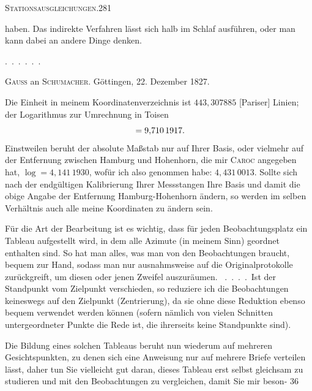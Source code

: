 \clearpage
\noindent\mbox{}\hfill\textsc{Stationsausgleichungen.}\hfill281\par\medskip
\noindent haben. Das indirekte Verfahren lässt sich halb im Schlaf ausführen, oder man kann dabei an andere Dinge denken.

\noindent\hspace*{1.5em}.\ .\ .\ .\ .\ .

\vspace{2cm}
\begin{center}
\textsc{Gauss} an \textsc{Schumacher}. Göttingen, 22. Dezember 1827.
\end{center}
Die Einheit in meinem Koordinatenverzeichnis ist $443{,}307885$ [Pariser] Linien; der Logarithmus zur Umrechnung in Toisen
\[
\llap{\raisebox{1.2ex}{\text{\tiny.}}\hspace{4cm}}=9{,}710\,1917.
\]
Einstweilen beruht der absolute Maßstab nur auf Ihrer Basis, oder vielmehr auf der Entfernung zwischen Hamburg und Hohenhorn, die mir \textsc{Caroc} angegeben hat, $\log=4{,}141\,1930$, wofür ich also genommen habe: $4{,}431\,0013$. Sollte sich nach der endgültigen Kalibrierung Ihrer Messstangen Ihre Basis und damit die obige Angabe der Entfernung Hamburg-Hohenhorn ändern, so werden im selben Verhältnis auch alle meine Koordinaten zu ändern sein.

Für die Art der Bearbeitung ist es wichtig, dass für jeden Beobachtungsplatz ein Tableau aufgestellt wird, in dem alle Azimute (in meinem Sinn) geordnet enthalten sind. So hat man alles, was man von den Beobachtungen braucht, bequem zur Hand, sodass man nur ausnahmsweise auf die Originalprotokolle zurückgreift, um diesen oder jenen Zweifel auszuräumen. \ .\ .\ .\ .\ Ist der Standpunkt vom Zielpunkt verschieden, so reduziere ich die Beobachtungen keineswegs auf den Zielpunkt (Zentrierung), da sie ohne diese Reduktion ebenso bequem verwendet werden können (sofern nämlich von vielen Schnitten untergeordneter Punkte die Rede ist, die ihrerseits keine Standpunkte sind).

\noindent\hfill\raisebox{.3ex}{\textbullet}\hspace*{1.2cm}\par
Die Bildung eines solchen Tableaus beruht nun wiederum auf mehreren Gesichtspunkten, zu denen sich eine Anweisung nur auf mehrere Briefe verteilen lässt, daher tun Sie vielleicht gut daran, dieses Tableau erst selbst gleichsam zu studieren und mit den Beobachtungen zu vergleichen, damit Sie mir beson-
\vfill
{}\hfill36
\endgroup

